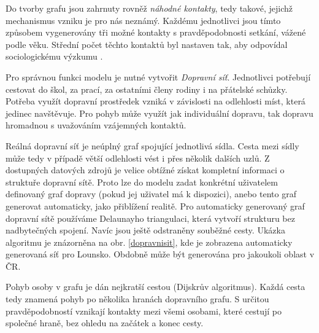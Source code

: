 Do tvorby grafu jsou zahrnuty rovněž \emph{náhodné kontakty}, tedy takové, jejichž mechanismus vzniku je pro nás neznámý. Každému jednotlivci jsou tímto způsobem vygenerovány tři možné kontakty s pravděpodobnosti setkání, vážené podle věku. Střední počet těchto kontaktů byl nastaven tak, aby odpovídal sociologickému výzkumu \cite{Prem_etal2017}.

Pro správnou funkci modelu je nutné vytvořit \emph{Dopravní síť}. Jednotlivci potřebují cestovat do škol, za prací, za ostatními členy rodiny i na přátelské schůzky. Potřeba využít dopravní prostředek vzniká v závislosti na odlehlosti míst, která jedinec navštěvuje. Pro pohyb může využít jak individuální dopravu, tak dopravu hromadnou s uvažováním vzájemných kontaktů. 

Reálná dopravní síť je neúplný graf spojující jednotlivá sídla. Cesta mezi sídly může tedy v případě větší odlehlosti vést i přes několik dalších uzlů. Z dostupných datových zdrojů je velice obtížné získat kompletní informaci o struktuře dopravní sítě. Proto lze do modelu zadat konkrétní uživatelem definovaný graf dopravy (pokud jej uživatel má k dispozici), anebo tento graf generovat automaticky, jako přiblížení realitě. Pro automaticky generovaný graf dopravní sítě používáme Delaunayho triangulaci, která vytvoří strukturu bez nadbytečných spojení. Navíc jsou ještě odstraněny souběžné cesty. Ukázka algoritmu je znázorněna na
obr. \ref{dopravnisit}, kde je zobrazena automaticky generovaná síť pro Lounsko. Obdobně může být generována pro jakoukoli oblast v ČR. 


Pohyb osoby v grafu je dán nejkratší cestou (Dijskrův algoritmus). Každá cesta tedy znamená pohyb po několika hranách dopravního grafu. S určitou pravděpodobností vznikají kontakty mezi všemi osobami, které cestují po společné hraně, bez ohledu na začátek a konec cesty. 





